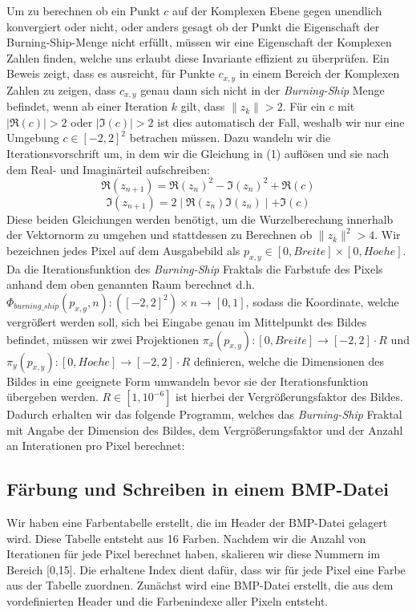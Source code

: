 \documentclass[course=erap]{aspdoc}
\begin{document}
Um zu berechnen ob ein Punkt $c$ auf der Komplexen Ebene gegen unendlich konvergiert oder nicht, oder anders gesagt ob der Punkt die Eigenschaft der Burning-Ship-Menge nicht erfüllt, müssen wir eine Eigenschaft der Komplexen Zahlen finden, welche uns erlaubt diese Invariante effizient zu überprüfen. Ein Beweis \cite{BoundaryTwoProof} zeigt, dass es ausreicht, für Punkte $c_{x,y}$ in einem Bereich der Komplexen Zahlen zu zeigen, dass $c_{x,y}$ genau dann sich nicht in der \emph{Burning-Ship} Menge befindet, wenn ab einer Iteration $k$ gilt, dass $\lVert z_{k} \rVert > 2$. Für ein $c$ mit $\mid\Re(c)\mid > 2$ oder $\mid\Im(c)\mid > 2$ ist dies automatisch der Fall, weshalb wir nur eine Umgebung $c \in [-2, 2]^2$ betrachen müssen. Dazu wandeln wir die Iterationsvorschrift um, in dem wir die Gleichung in (1) auflösen und sie nach dem Real- und Imaginärteil aufschreiben:
\begin{equation}
\Re(z_{n+1}) = \Re(z_{n})^2 - \Im(z_{n})^2 + \Re(c)
\end{equation}
\begin{equation}
\Im(z_{n+1}) = 2\mid\Re(z_{n})\Im(z_{n})\mid + \Im(c)
\end{equation}
Diese beiden Gleichungen werden benötigt, um die Wurzelberechung innerhalb der Vektornorm zu umgehen und stattdessen zu Berechnen ob $\lVert z_{k} \rVert ^ 2 > 4$. Wir bezeichnen jedes Pixel auf dem Ausgabebild als $p_{x,y} \in [0,Breite] \times [0, Hoehe]$. Da die Iterationsfunktion des \emph{Burning-Ship} Fraktals die Farbstufe des Pixels anhand dem oben genannten Raum berechnet d.h. $\Phi_{burning\_ship}(p_{x,y}, n) : ([-2, 2]^2) \times n \rightarrow [0, 1]$, sodass die Koordinate, welche vergrößert werden soll, sich bei Eingabe genau im Mittelpunkt des Bildes befindet, müssen wir zwei Projektionen $\pi_{x}(p_{x,y}) : [0, Breite] \rightarrow [-2,2] \cdot R$ und $\pi_{y}(p_{x,y}) : [0, Hoehe] \rightarrow [-2,2] \cdot R$ definieren, welche die Dimensionen des Bildes in eine geeignete Form umwandeln bevor sie der Iterationsfunktion übergeben werden. $R \in [1, 10^{-6}]$ ist hierbei der Vergrößerungsfaktor des Bildes. Dadurch erhalten wir das folgende Programm, welches das \emph{Burning-Ship} Fraktal mit Angabe der Dimension des Bildes, dem Vergrößerungsfaktor und der Anzahl an Interationen pro Pixel berechnet:

\subsection{Färbung und Schreiben in einem BMP-Datei}
Wir haben eine Farbentabelle erstellt, die im Header der BMP-Datei gelagert wird. Diese Tabelle entsteht aus 16 Farben. Nachdem wir die Anzahl von Iterationen für jede Pixel berechnet haben, skalieren wir diese Nummern im Bereich [0,15]. Die erhaltene Index dient dafür, dass wir für jede Pixel eine Farbe aus der Tabelle zuordnen. Zunächst wird eine BMP-Datei erstellt, die aus dem vordefinierten Header und die Farbenindexe aller Pixeln entsteht.
\end{document}
